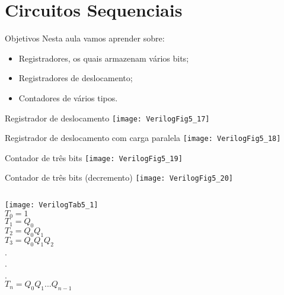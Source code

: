 

\subtitle{Circuitos Sequenciais: Registradores} %



\begin{frame}
	\titlepage
\end{frame} 

\section{Circuitos Sequenciais}

\begin{frame}{Objetivos}   %
    Nesta aula vamos aprender sobre:
    \begin{itemize}
        \item Registradores, os quais armazenam vários bits;
        \item Registradores de deslocamento;
        \item Contadores de vários tipos.
    \end{itemize}
\end{frame}

\begin{frame}{Registrador de deslocamento}   \centering
    \texttt{[image: VerilogFig5\_17]} \\
\end{frame}

\begin{frame}{Registrador de deslocamento com carga paralela}   \centering
    \texttt{[image: VerilogFig5\_18]} \\
\end{frame}

\begin{frame}{Contador de três bits}   \centering
    \texttt{[image: VerilogFig5\_19]} \\
\end{frame}

\begin{frame}{Contador de três bits (decremento)}   \centering
    \texttt{[image: VerilogFig5\_20]} \\
\end{frame}

\begin{frame}{}   \centering
	\begin{columns}
    \texttt{[image: VerilogTab5\_1]} \\
        $T_0 = 1$ \\
        $T_1 = Q_0$ \\
        $T_2 = Q_0Q_1$ \\
        $T_3 = Q_0Q_1Q_2$ \\
        . \\
        . \\
        . \\
        $T_n = Q_0Q_1...Q_{n-1}$ \\
    \end{columns}
\end{frame}

